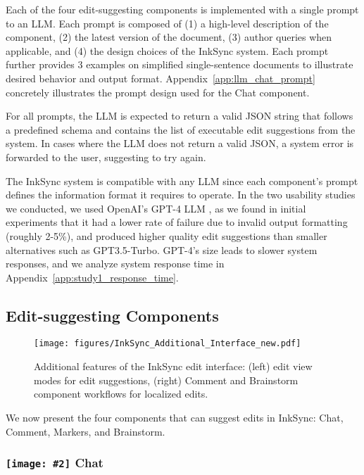 \documentclass[manuscript]{acmart}
\newcommand{\symbolimg}[2][0.4cm]{%
  \texttt{[image: \#2]}%
}
\begin{document}
Each of the four edit-suggesting components is implemented with a single prompt to an LLM. Each prompt is composed of (1) a high-level description of the component, (2) the latest version of the document, (3) author queries when applicable, and (4) the design choices of the InkSync system. Each prompt further provides 3 examples on simplified single-sentence documents to illustrate desired behavior and output format. Appendix~\ref{app:llm_chat_prompt} concretely illustrates the prompt design used for the Chat component.

For all prompts, the LLM is expected to return a valid JSON string that follows a predefined schema and contains the list of executable edit suggestions from the system. In cases where the LLM does not return a valid JSON, a system error is forwarded to the user, suggesting to try again. 

The InkSync system is compatible with any LLM since each component's prompt defines the information format it requires to operate. In the two usability studies we conducted, we used OpenAI's GPT-4 LLM \cite{OpenAI2023GPT4TR}, as we found in initial experiments that it had a lower rate of failure due to invalid output formatting (roughly 2-5\%), and produced higher quality edit suggestions than smaller alternatives such as GPT3.5-Turbo. GPT-4's size leads to slower system responses, and we analyze system response time in Appendix~\ref{app:study1_response_time}.

\subsection{Edit-suggesting Components} \label{sec:edit_suggesting_components}

\begin{figure*}
    \centering
    \texttt{[image: figures/InkSync\_Additional\_Interface\_new.pdf]}
    \caption{Additional features of the InkSync edit interface: (left) edit view modes for edit suggestions, (right) Comment and Brainstorm component workflows for localized edits.}
    \label{fig:inksync_additional_components}
\end{figure*}
We now present the four components that can suggest edits in InkSync: Chat, Comment, Markers, and Brainstorm.

\subsubsection{\symbolimg{figures/icons/chat.png} Chat} \label{sec:chat}
\end{document}
